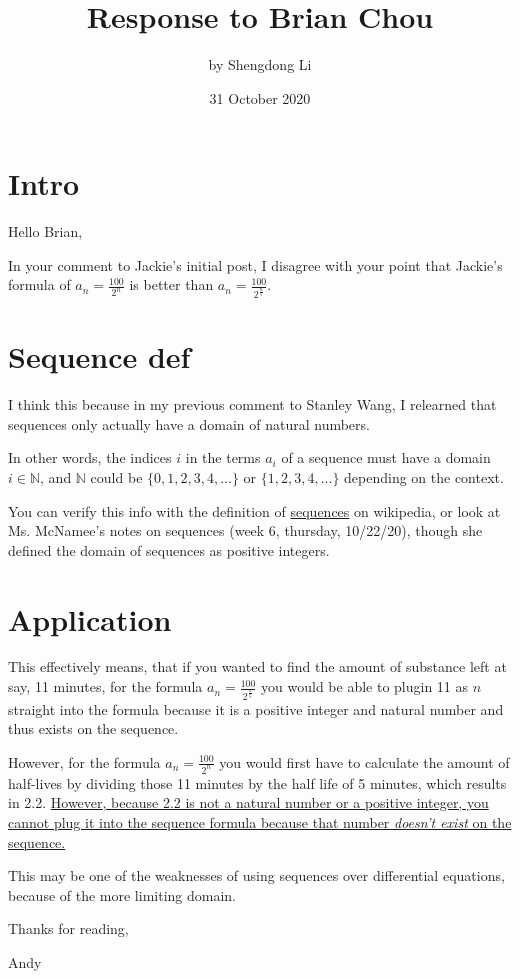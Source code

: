 \documentclass[12pt]{article}
\begin{document}
\title{Response to Brian Chou}
\author{by Shengdong Li}
\date{31 October 2020}
\maketitle

\section{Intro}

Hello Brian,

In your comment to Jackie's initial post, I disagree with your point that Jackie's formula of $a_{n}=\frac{100}{2^{n}}$ is better than $a_{n}=\frac{100}{2^{\frac{n}{5}}}$.

\section{Sequence def}
I think this because in my previous comment to Stanley Wang, I relearned that sequences only actually have a domain of natural numbers.

In other words, the indices $i$ in the terms $a_i$ of a sequence must have a domain $i\in\mathbb{N}$, and $\mathbb{N}$ could be $\{0, 1, 2, 3, 4,...\}$ or $\{1,2,3,4,...\}$ depending on the context.

You can verify this info with the definition of \href{https://en.wikipedia.org/wiki/Sequence}{sequences} on wikipedia, or look at Ms. McNamee's notes on sequences (week 6, thursday, 10/22/20), though she defined the domain of sequences as positive integers.

\section{Application}
This effectively means, that if you wanted to find the amount of substance left at say, 11 minutes, for the formula $a_{n}=\frac{100}{2^{\frac{n}{5}}}$ you would be able to plugin 11 as $n$ straight into the formula because it is a positive integer and natural number and thus exists on the sequence. 

However, for the formula $a_{n}=\frac{100}{2^{n}}$ you would first have to calculate the amount of half-lives by dividing those 11 minutes by the half life of 5 minutes, which results in 2.2. \uline{However, because 2.2 is not a natural number or a positive integer, you cannot plug it into the sequence formula because that number \textit{doesn't exist} on the sequence.}

This may be one of the weaknesses of using sequences over differential equations, because of the more limiting domain.

Thanks for reading,

Andy
\end{document}
